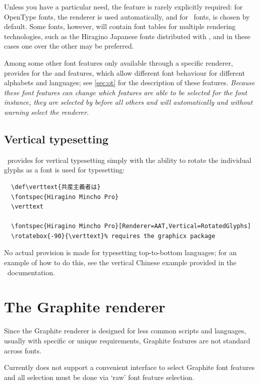 \documentclass[a4paper]{l3doc}
\begin{document}
Unless you have a particular need, the  feature is rarely explicitly required: for OpenType
fonts, the  renderer is used automatically, and for \AAT\ fonts,
 is chosen by default. Some fonts, however, will contain font tables
for multiple rendering technologies, such as the Hiragino Japanese fonts
distributed with \MacOSX, and in these cases one over the other may be preferred.

Among some other font features only available through a specific renderer,
 provides for the  and  features, which allow
different font behaviour for different alphabets and languages; see \vref{sec:ot}
for the description of these features. {\em Because these font features can
change which features are able to be selected for the font instance, they are selected
by  before all others and will automatically and without warning
select the  renderer.}


\subsection{Vertical typesetting}

\XeTeX\ provides for vertical typesetting simply with the ability to rotate
the individual glyphs as a font is used for typesetting:
\begin{Verbatim}
  \def\verttext{共産主義者は}
  \fontspec{Hiragino Mincho Pro}
  \verttext

  \fontspec{Hiragino Mincho Pro}[Renderer=AAT,Vertical=RotatedGlyphs]
  \rotatebox{-90}{\verttext}% requires the graphicx package
\end{Verbatim}

No actual provision is made for typesetting top-to-bottom
languages; for an example of how to do this, see the vertical Chinese
example provided in the \XeTeX\ documentation.


\section{The Graphite renderer}
\label{sec:graphite-features}

Since the Graphite renderer is designed for less common scripts and languages, usually with
specific or unique requirements, Graphite features are not standard across fonts.

Currently  does not support a convenient interface to select Graphite font
features and all selection must be done via `raw' font feature selection.
\end{document}
